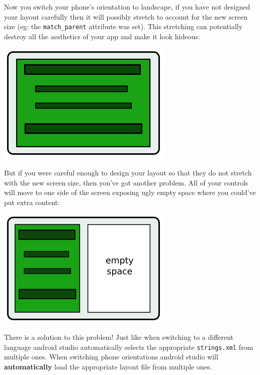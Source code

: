 Now you switch your phone's orientation to landscape, if you have not designed your layout carefully then it will possibly stretch to account for the new screen size (eg: the \texttt{match\_parent} attribute was set). This stretching can potentially destroy all the aesthetics of your app and make it look hideous:

\begin{center}
	\includegraphics[scale=0.4]{chapters/ch04/images/23}
\end{center}

But if you were careful enough to design your layout so that they do not stretch with the new screen size, then you've got another problem. All of your controls will move to one side of the screen exposing ugly empty space where you could've put extra content:

\begin{center}
	\includegraphics[scale=0.4]{chapters/ch04/images/24}
\end{center}

There is a solution to this problem! Just like when switching to a different language android studio automatically selects the appropriate \texttt{strings.xml} from multiple ones. When switching phone orientations android studio will \textbf{automatically} load the appropriate layout file from multiple ones. \\

